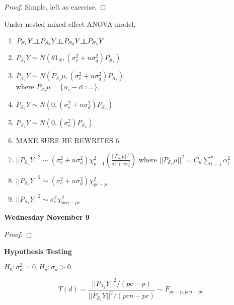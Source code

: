 \documentclass[11pt,fleqn]{book} %
\newcommand{\indep}{\rotatebox[origin=c]{90}{$\models$}}
\begin{document}
\begin{proof}
	Simple, left as exercise.
\end{proof}

\begin{theorem}
	Under nested mixed effect ANOVA model, 

		\begin{enumerate}
			\item $P_{\mathcal{S}_1}Y \indep P_{\mathcal{S}_2}Y \indep P_{\mathcal{S}_3}Y \indep P_{\mathcal{S}_4}Y$
			\item $P_{\mathcal{S}_1}Y \sim N (\theta 1_N, (\sigma_e^2 + n \sigma_d^2)P_{\mathcal{S}_1}) $
			\item $P_{\mathcal{S}_2}Y \sim N (P_{\mathcal{S}_2}\mu, (\sigma_e^2 + n \sigma_d^2)P_{\mathcal{S}_2}) $\\

			where $P_{\mathcal{S}_2}\mu = \{\alpha_i - \bar{\alpha_\cdot}: \dots\}$.

			\item $P_{\mathcal{S}_3}Y \sim N (0, (\sigma_e^2 + n \sigma_d^2)P_{\mathcal{S}_3}) $


			\item $P_{\mathcal{S}_4}Y \sim N (0, (\sigma_e^2 )P_{\mathcal{S}_4}) $
			\item MAKE SURE HE REWRITES 6.
			\item $||P_{\mathcal{S}_2}Y||^2 \sim (\sigma^2_e + n \sigma^2_d) \chi^2_{p-1}(\frac{||P_{\mathcal{S}_2}\mu||^2}{\sigma^2_e + e \sigma^2_d})$ where $||P_{\mathcal{S}_2}\mu||^2 = C_n \sum^p_{i=1} \alpha_i^2$
			\item$||P_{\mathcal{S}_3}Y||^2 \sim (\sigma^2_e + n \sigma^2_d) \chi^2_{pc-p}$
			\item $||P_{\mathcal{S}_4}Y||^2 \sim \sigma^2_e \chi^2_{pcn - pc}$

		\end{enumerate}
\end{theorem}



 

\textbf{Wednesday November 9}\\

\begin{proof}
	
\end{proof}

\textbf{Hypothesis Testing}

$H_0: \sigma_d^2 = 0, H_a: \sigma_d > 0$
		

		$$T(d) = \frac{||P_{\mathcal{S}_3}Y||^2/(pc-p)}{||P_{\mathcal{S}_4}Y||^2/(pcn-pc)} \sim F_{pc- p, pcn - pc}$$
\end{document}
